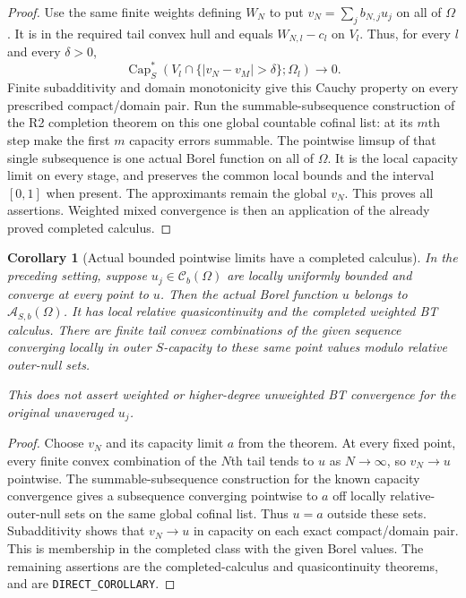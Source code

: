 \documentclass[11pt,a4paper]{article}
\numberwithin{equation}{section}
\newtheorem{corollary}[theorem]{Corollary}
\theoremstyle{definition}
\theoremstyle{remark}
\newcommand{\Cb}{\mathcal C_b}
\begin{document}
\begin{proof}
Use the same finite weights defining $W_N$ to put
$v_N=\sum_jb_{N,j}u_j$ on all of $\Omega$. It is in
the required tail convex hull and equals $W_{N,l}-c_l$
on $V_l$. Thus, for every $l$ and every $\delta>0$,
\[
 \operatorname{Cap}_S^*
   (V_l\cap\{|v_N-v_M|>\delta\};\Omega_l)\longrightarrow0.
\]
Finite subadditivity and domain monotonicity give this
Cauchy property on every prescribed compact/domain pair.
Run the summable-subsequence construction of the R2 completion
theorem on this one global countable cofinal list: at its
$m$th step make the first $m$ capacity errors summable.
The pointwise limsup of that single subsequence is one
actual Borel function on all of $\Omega$. It is the local
capacity limit on every stage, and preserves the common
local bounds and the interval $[0,1]$ when present.
The approximants remain the global $v_N$. This proves
all assertions. Weighted mixed convergence is then an
application of the already proved completed calculus.
\end{proof}

\begin{corollary}[Actual bounded pointwise limits have a completed calculus]
\label{cor:r3-pointwise-completed}
In the preceding setting, suppose $u_j\in\Cb(\Omega)$ are locally
uniformly bounded and converge at every point to $u$. Then the
actual Borel function $u$ belongs to $\mathcal A_{S,b}(\Omega)$.
It has local relative quasicontinuity and the completed weighted
BT calculus. There are finite tail convex combinations of the
given sequence converging locally in outer $S$-capacity to these
same point values modulo relative outer-null sets.

This does not assert weighted or higher-degree unweighted
BT convergence for the original unaveraged $u_j$.
\end{corollary}

\begin{proof}
Choose $v_N$ and its capacity limit $a$ from the theorem.
At every fixed point, every finite convex combination of
the $N$th tail tends to $u$ as $N\to\infty$, so $v_N\to u$
pointwise. The summable-subsequence construction for the
known capacity convergence gives a subsequence converging
pointwise to $a$ off locally relative-outer-null sets on
the same global cofinal list. Thus $u=a$ outside these
sets. Subadditivity shows that $v_N\to u$ in capacity
on each exact compact/domain pair. This is membership
in the completed class with the given Borel values.
The remaining assertions are the completed-calculus
and quasicontinuity theorems, and are
\texttt{DIRECT\_COROLLARY}.
\end{proof}
\end{document}
